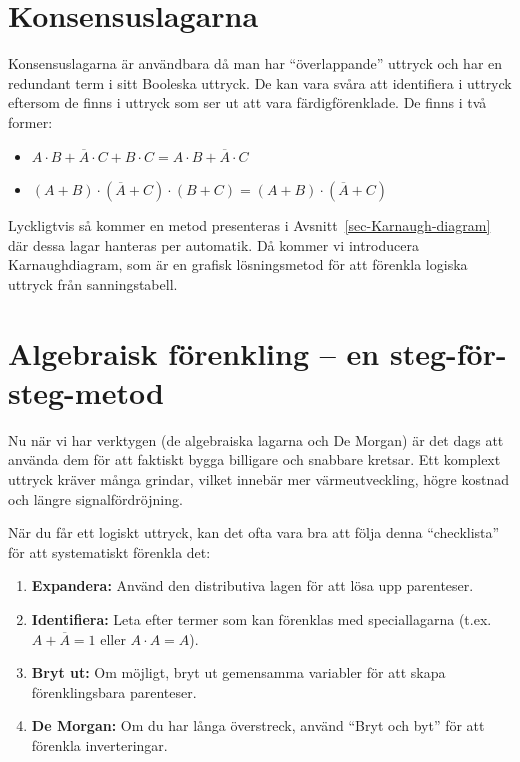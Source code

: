 \documentclass[
  swedish,
  letterpaper,
  oneside,
  openany]{book}
\providecommand{\tightlist}{%
  \setlength{\itemsep}{0pt}\setlength{\parskip}{0pt}}
\begin{document}
\section{Konsensuslagarna}\label{konsensuslagarna}

Konsensuslagarna är användbara då man har ``överlappande'' uttryck och
har en redundant term i sitt Booleska uttryck. De kan vara svåra att
identifiera i uttryck eftersom de finns i uttryck som ser ut att vara
färdigförenklade. De finns i två former:

\begin{itemize}
\tightlist
\item
  \(A \cdot B + \overline{A} \cdot C + B \cdot C = A \cdot B + \overline{A} \cdot C\)
\item
  \((A + B) \cdot (\overline{A} + C) \cdot (B + C) = (A + B) \cdot (\overline{A} + C)\)
\end{itemize}

Lyckligtvis så kommer en metod presenteras i
Avsnitt~\ref{sec-Karnaugh-diagram} där dessa lagar hanteras per
automatik. Då kommer vi introducera Karnaughdiagram, som är en grafisk
lösningsmetod för att förenkla logiska uttryck från sanningstabell.

\section{Algebraisk förenkling -- en
steg-för-steg-metod}\label{algebraisk-fuxf6renkling-en-steg-fuxf6r-steg-metod}

Nu när vi har verktygen (de algebraiska lagarna och De Morgan) är det
dags att använda dem för att faktiskt bygga billigare och snabbare
kretsar. Ett komplext uttryck kräver många grindar, vilket innebär mer
värmeutveckling, högre kostnad och längre signalfördröjning.

När du får ett logiskt uttryck, kan det ofta vara bra att följa denna
``checklista'' för att systematiskt förenkla det:

\begin{enumerate}
\def\labelenumi{\arabic{enumi}.}
\tightlist
\item
  \textbf{Expandera:} Använd den distributiva lagen för att lösa upp
  parenteser.
\item
  \textbf{Identifiera:} Leta efter termer som kan förenklas med
  speciallagarna (t.ex. \(A + \overline{A} = 1\) eller
  \(A \cdot A = A\)).
\item
  \textbf{Bryt ut:} Om möjligt, bryt ut gemensamma variabler för att
  skapa förenklingsbara parenteser.
\item
  \textbf{De Morgan:} Om du har långa överstreck, använd ``Bryt och
  byt'' för att förenkla inverteringar.
\end{enumerate}
\end{document}
